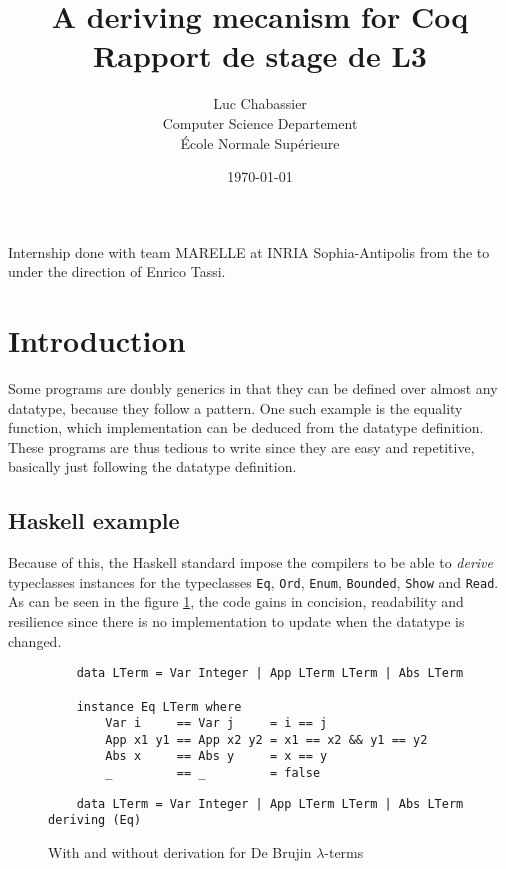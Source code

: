 \documentclass{article}
\title{A deriving mecanism for Coq\\
    {\normalsize Rapport de stage de L3}}
\author{Luc Chabassier\\
    Computer Science Departement\\
    École Normale Supérieure
}
\date{\today}
\begin{document}
\maketitle
\vfill
\tableofcontents
\vfill
Internship done with team MARELLE at INRIA Sophia-Antipolis from the
 to  under the direction of
Enrico Tassi.
\newpage


\section{Introduction}

Some programs are doubly generics in that they can be defined over almost any
datatype, because they follow a pattern. One such example is the equality
function, which implementation can be deduced from the datatype definition. These
programs are thus tedious to write since they are easy and repetitive, basically
just following the datatype definition.

\subsection{Haskell example}

Because of this, the Haskell standard impose the compilers to be able to \emph{derive}
typeclasses instances for the typeclasses \texttt{Eq}, \texttt{Ord}, \texttt{Enum},
\texttt{Bounded}, \texttt{Show} and \texttt{Read}. As can be seen in the
figure \ref{woDeriv}, the code gains in concision, readability and resilience
since there is no implementation to update when the datatype is changed.

\begin{figure}
    \begin{lstlisting}
    data LTerm = Var Integer | App LTerm LTerm | Abs LTerm

    instance Eq LTerm where
        Var i     == Var j     = i == j
        App x1 y1 == App x2 y2 = x1 == x2 && y1 == y2
        Abs x     == Abs y     = x == y
        _         == _         = false
    \end{lstlisting}

    \begin{lstlisting}
    data LTerm = Var Integer | App LTerm LTerm | Abs LTerm deriving (Eq)
    \end{lstlisting}
    \caption{With and without derivation for De Brujin $\lambda$-terms}
    \label{woDeriv}
\end{figure}
\end{document}
